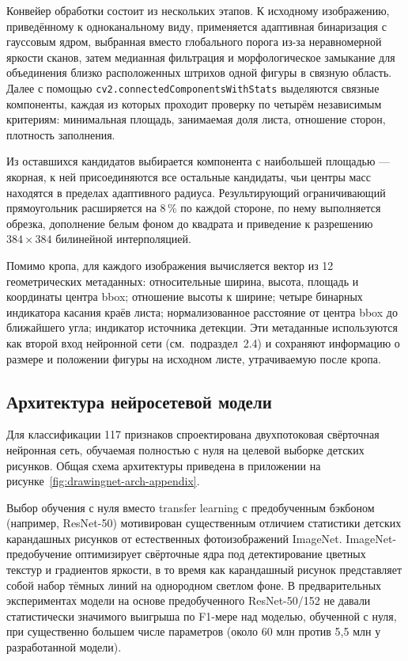 Конвейер обработки состоит из нескольких этапов. К исходному изображению, приведённому к одноканальному виду, применяется адаптивная бинаризация с гауссовым ядром, выбранная вместо глобального порога из-за неравномерной яркости сканов, затем медианная фильтрация и морфологическое замыкание для объединения близко расположенных штрихов одной фигуры в связную область. Далее с помощью \texttt{cv2.connectedComponentsWithStats} выделяются связные компоненты, каждая из которых проходит проверку по четырём независимым критериям: минимальная площадь, занимаемая доля листа, отношение сторон, плотность заполнения.

Из оставшихся кандидатов выбирается компонента с наибольшей площадью --- якорная, к ней присоединяются все остальные кандидаты, чьи центры масс находятся в пределах адаптивного радиуса. Результирующий ограничивающий прямоугольник расширяется на 8\,\% по каждой стороне, по нему выполняется обрезка, дополнение белым фоном до квадрата и приведение к разрешению $384 \times 384$ билинейной интерполяцией.

Помимо кропа, для каждого изображения вычисляется вектор из 12 геометрических метаданных: относительные ширина, высота, площадь и координаты центра bbox; отношение высоты к ширине; четыре бинарных индикатора касания краёв листа; нормализованное расстояние от центра bbox до ближайшего угла; индикатор источника детекции. Эти метаданные используются как второй вход нейронной сети (см.~подраздел~2.4) и сохраняют информацию о размере и положении фигуры на исходном листе, утрачиваемую после кропа.

\subsection{Архитектура нейросетевой модели}

Для классификации 117 признаков спроектирована двухпотоковая свёрточная нейронная сеть, обучаемая полностью с нуля на целевой выборке детских рисунков. Общая схема архитектуры приведена в приложении на рисунке~\ref{fig:drawingnet-arch-appendix}.

Выбор обучения с нуля вместо transfer learning с предобученным бэкбоном (например, ResNet-50) мотивирован существенным отличием статистики детских карандашных рисунков от естественных фотоизображений ImageNet. ImageNet-предобучение оптимизирует свёрточные ядра под детектирование цветных текстур и градиентов яркости, в то время как карандашный рисунок представляет собой набор тёмных линий на однородном светлом фоне. В предварительных экспериментах модели на основе предобученного ResNet-50/152 не давали статистически значимого выигрыша по F1-мере над моделью, обученной с нуля, при существенно большем числе параметров (около 60 млн против 5,5 млн у разработанной модели).

